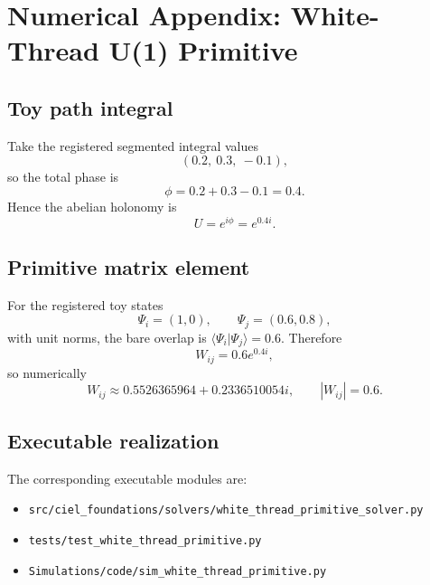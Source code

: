 \appendix
\section{Numerical Appendix: White-Thread U(1) Primitive}
\label{app:white-thread-primitive}

\subsection{Toy path integral}
Take the registered segmented integral values
\begin{equation}
(0.2,\ 0.3,\ -0.1),
\end{equation}
so the total phase is
\begin{equation}
\phi = 0.2+0.3-0.1 = 0.4.
\end{equation}
Hence the abelian holonomy is
\begin{equation}
U = e^{i\phi} = e^{0.4 i}.
\end{equation}

\subsection{Primitive matrix element}
For the registered toy states
\begin{equation}
\Psi_i = (1,0),
\qquad
\Psi_j = (0.6,0.8),
\end{equation}
with unit norms, the bare overlap is $\langle\Psi_i|\Psi_j\rangle = 0.6$. Therefore
\begin{equation}
W_{ij} = 0.6 e^{0.4 i},
\end{equation}
so numerically
\begin{equation}
W_{ij} \approx 0.5526365964 + 0.2336510054 i,
\qquad
|W_{ij}| = 0.6.
\end{equation}

\subsection{Executable realization}
The corresponding executable modules are:
\begin{itemize}
  \item \texttt{src/ciel\_foundations/solvers/white\_thread\_primitive\_solver.py}
  \item \texttt{tests/test\_white\_thread\_primitive.py}
  \item \texttt{Simulations/code/sim\_white\_thread\_primitive.py}
\end{itemize}
